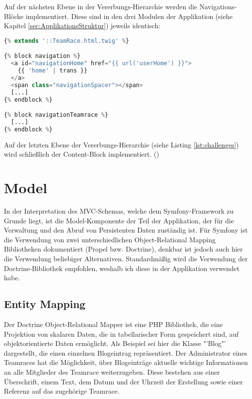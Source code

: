 \documentclass[12pt]{report}
\begin{document}
Auf der nächsten Ebene in der Vererbungs-Hierarchie werden die Navigations-Blöcke implementiert. Diese sind in den drei Modulen der Applikation (siehe Kapitel \ref{sec:ApplikationsStruktur}) jeweils identisch: 
\begin{lstlisting}[language=PHP, caption=Auszug aus \\src/TeamRace/WebBundle/Resources/views/Teamrace/\_layout.html.twig]
{% extends '::TeamRace.html.twig' %}

{% block navigation %}
  <a id="navigationHome" href="{{ url('userHome') }}">
    {{ 'home' | trans }}
  </a>
  <span class="navigationSpacer"></span>
  [...]
{% endblock %}

{% block navigationTeamrace %}
  [...]
{% endblock %}
\end{lstlisting}

Auf der letzten Ebene der Vererbungs-Hierarchie (siehe Listing \ref{lst:challenges}) wird schließlich der Content-Block implementiert.
(\cite{Twig})

\section{Model}

In der Interpretation des MVC-Schemas, welche dem Symfony-Framework zu Grunde liegt, ist die Model-Komponente der Teil der Applikation, der für die Verwaltung und den Abruf von Persistenten Daten zuständig ist. Für Symfony ist die Verwendung von zwei unterschiedlichen Object-Relational Mapping Bibliotheken dokumentiert (Propel bzw. Doctrine), denkbar ist jedoch auch hier die Verwendung beliebiger Alternativen. Standardmäßig wird die Verwendung der Doctrine-Bibliothek empfohlen, weshalb ich diese in der Applikation verwendet habe.

\subsection{Entity Mapping}
\label{entityMapping}
 
Der Doctrine Object-Relational Mapper ist eine PHP Bibliothek, die eine Projektion von skalaren Daten, die in tabellarischer Form gespeichert sind, auf objektorientierte Daten ermöglicht. Als Beispiel sei hier die Klasse "'Blog"' dargestellt, die einen einzelnen Blogeintrag repräsentiert. Der Administrator eines Teamraces hat die Möglichkeit, über Blogeinträge aktuelle wichtige Informationen an alle Mitglieder des Teamrace weiterzugeben. Diese bestehen aus einer Überschrift, einem Text, dem Datum und der Uhrzeit der Erstellung sowie einer Referenz auf das zugehörige Teamrace.
\end{document}
